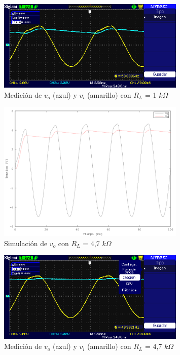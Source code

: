 \begin{figure}[H]
  \centering
      \includegraphics[width=0.8\textwidth]{gfxsantiago/FIG_MED_Rectificador_Simple_3B1.png}
  \caption{Medición de $v_{o}$ (azul) y $v_{i}$ (amarillo) con $R_{L}$ = 1 $k\Omega$}
\end{figure}

\begin{figure}[H]
  \centering
      \includegraphics[width=0.8\textwidth]{gfxsantiago/FIG_SIM_Rectificador_Simple_3B2.png}
  \caption{Simulación de $v_{o}$ con $R_{L}$ = 4,7 $k\Omega$}
\end{figure}

\begin{figure}[H]
  \centering
      \includegraphics[width=0.8\textwidth]{gfxsantiago/FIG_MED_Rectificador_Simple_3B2.png}
  \caption{Medición de $v_{o}$ (azul) y $v_{i}$ (amarillo) con $R_{L}$ = 4,7 $k\Omega$}
\end{figure}

